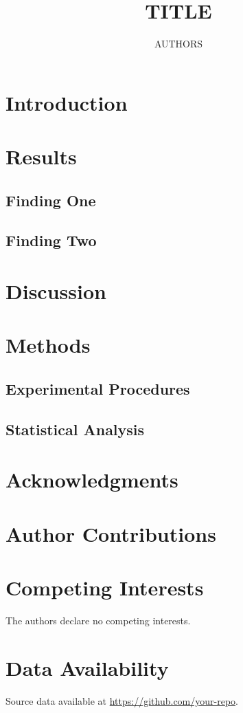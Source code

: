 \documentclass[10pt,twocolumn]{article}
\title{\textbf{{{TITLE}}}}
\author[1,2,*]{{{AUTHORS}}}
\affil[1]{{{AFFILIATIONS}}}
\affil[*]{\small\textit{Correspondence: author@institution.edu}}
\date{}
\begin{document}
\section{Introduction}
\section{Results}
\subsection{Finding One}
\subsection{Finding Two}
\section{Discussion}
\section*{Methods}
\subsection*{Experimental Procedures}
\subsection*{Statistical Analysis}
\section*{Acknowledgments}
\section*{Author Contributions}
\section*{Competing Interests}
The authors declare no competing interests.
\section*{Data Availability}
Source data available at \url{https://github.com/your-repo}.


\end{document}

